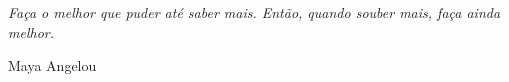 \begin{epigrafe}
  \vspace*{\fill}
  \epigraph{\textit{Faça o melhor que puder até saber mais. Então, quando souber mais, faça ainda melhor.}}{Maya Angelou}
\end{epigrafe}
